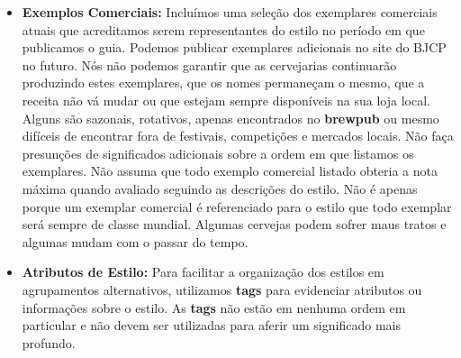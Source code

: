\begin{itemize}
\item \textbf{Exemplos Comerciais:} Incluímos uma seleção dos exemplares comerciais atuais que acreditamos serem representantes do estilo no período em que publicamos o guia. Podemos publicar exemplares adicionais no site do BJCP no futuro. Nós não podemos garantir que as cervejarias continuarão produzindo estes exemplares, que os nomes permaneçam o mesmo, que a receita não vá mudar ou que estejam sempre disponíveis na sua loja local. Alguns são sazonais, rotativos, apenas encontrados no \textbf{brewpub} ou mesmo difíceis de encontrar fora de festivais, competições e mercados locais.
Não faça presunções de significados adicionais sobre a ordem em que listamos os exemplares. Não assuma que todo exemplo comercial listado obteria a nota máxima quando avaliado seguindo as descrições do estilo. Não é apenas porque um exemplar comercial é referenciado para o estilo que todo exemplar será sempre de classe mundial. Algumas cervejas podem sofrer maus tratos e algumas mudam com o passar do tempo.
\item \textbf{Atributos de Estilo:} Para facilitar a organização dos estilos em agrupamentos alternativos, utilizamos \textbf{tags} para evidenciar atributos ou informações sobre o estilo. As \textbf{tags} não estão em nenhuma ordem em particular e não devem ser utilizadas para aferir um significado mais profundo.
\end{itemize}